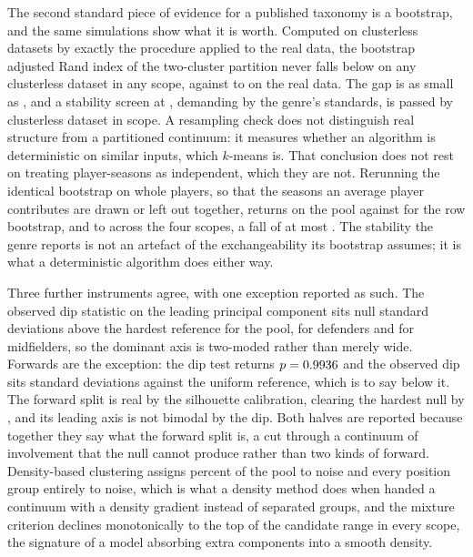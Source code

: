The second standard piece of evidence for a published taxonomy is a bootstrap, and the same
simulations show what it is worth. Computed on clusterless datasets by exactly the procedure
applied to the real data, the bootstrap adjusted Rand index of the two-cluster partition never
falls below \StrBootNullMinSingle{} on any clusterless dataset in any scope, against
\StrBootObsMin{} to \StrBootObsMax{} on the real data. The gap is as small as \StrBootGapMin{},
and a stability screen at \StrBootScreen{}, demanding by the genre's standards, is passed by
\StrBootNullPassesScreen{} clusterless dataset in \StrBootNullPassesScreen{} scope. A resampling
check does not distinguish real structure from a partitioned continuum: it measures whether an
algorithm is deterministic on similar inputs, which $k$-means is. That conclusion does not rest
on treating player-seasons as independent, which they are not. Rerunning the identical bootstrap
on whole players, so that the \NestPerPlayerAll{} seasons an average player contributes are drawn
or left out together, returns \NestBlockAll{} on the pool against \NestRowAll{} for the row
bootstrap, and \NestBlockMin{} to \NestBlockMax{} across the four scopes, a fall of at most
\NestLargestFall{}. The
stability the genre reports is not an artefact of the exchangeability its bootstrap assumes; it
is what a deterministic algorithm does either way.

Three further instruments agree, with one exception reported as such. The observed dip statistic
on the leading principal component sits \StrDipMinZAll{} null standard deviations above the
hardest reference for the pool, \StrDipMinZDF{} for defenders and \StrDipMinZMF{} for
midfielders, so the dominant axis is two-moded rather than merely wide. Forwards are the
exception: the dip test returns $p=0.9936{}$ and the observed dip sits \StrDipMinZFW{}
standard deviations against the uniform reference, which is to say below it. The forward split is
real by the silhouette calibration, clearing the hardest null by \StrMinZFW{}, and its leading
axis is not bimodal by the dip. Both halves are reported because together they say what the
forward split is, a cut through a continuum of involvement that the null cannot produce rather
than two kinds of forward. Density-based clustering assigns \StrNoisePctAll{} percent of the pool to noise
and every position group entirely to noise, which is what a density method does when handed a
continuum with a density gradient instead of separated groups, and the mixture criterion declines
monotonically to the top of the candidate range in every scope, the signature of a model
absorbing extra components into a smooth density.

